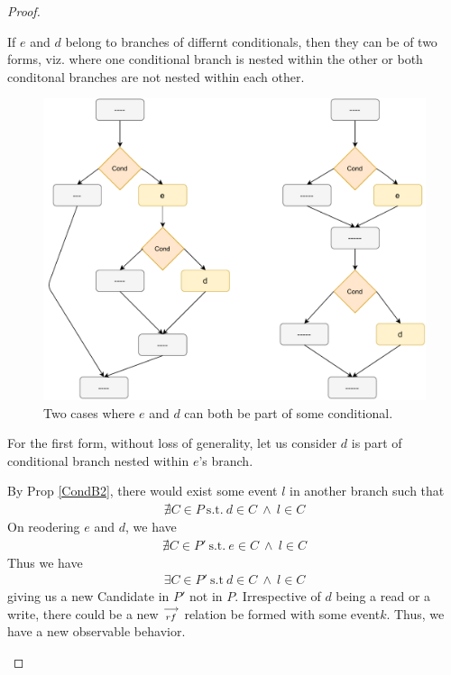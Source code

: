 \begin{proof}
\begin{itemize}
                    If $e$ and $d$ belong to branches of differnt conditionals, then they can be of two forms, viz. where one conditional branch is nested within the other or both conditonal branches are not nested within each other.  

                    \begin{figure}[H]
                        \centering 
                        \includegraphics[scale=0.7]{InstructionReordering/ConditionalsProofFig2.pdf}
                        \caption{Two cases where $e$ and $d$ can both be part of some conditional.}
                    \end{figure}

                    For the first form, without loss of generality, let us consider $d$ is part of conditional branch nested within $e$'s branch. 

                    By Prop \ref{CondB2}, there would exist some event $l$ in another branch such that 
                    \begin{align*}
                        \nexists C \in P \ \text{s.t.} \ d \in C \ \wedge \ l \in C 
                    \end{align*}
                    On reodering $e$ and $d$, we have 
                    \begin{align*}
                        \nexists C \in P' \ \text{s.t.} \ e \in C \ \wedge \ l \in C 
                    \end{align*}
                    Thus we have 
                    \begin{align*}
                        \exists C \in P' \ \text{s.t} \ d \in C \ \wedge \ l \in C
                    \end{align*}
                    giving us a new Candidate in $P'$ not in $P$. 
                    Irrespective of $d$ being a read or a write, there could be a new $\stackrel{\longrightarrow}{_{rf}}$ relation be formed with some event$k$. Thus, we have a new observable behavior. 


\end{itemize}
\end{proof}
